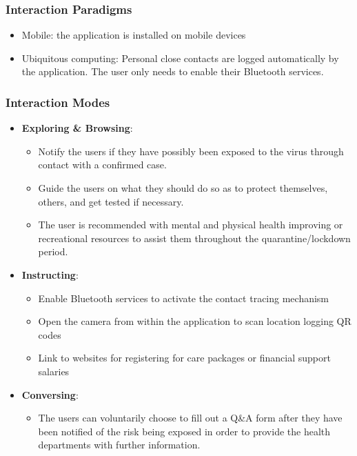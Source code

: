     \subsubsection{Interaction Paradigms}
      \begin{itemize}
        \item Mobile: the application is installed on mobile devices
        \item Ubiquitous computing: Personal close contacts are logged automatically by the application. The user only needs to enable their Bluetooth services.
      \end{itemize}

    \subsubsection{Interaction Modes}
      \begin{itemize}
        \item \textbf{Exploring \& Browsing}:
          \begin{itemize}
            \item Notify the users if they have possibly been exposed to the virus through contact with a confirmed case.
            \item Guide the users on what they should do so as to protect themselves, others, and get tested if necessary.
            \item The user is recommended with mental and physical health improving or recreational resources to assist them throughout the quarantine/lockdown period.
          \end{itemize}
        \item \textbf{Instructing}:
          \begin{itemize}
            \item Enable Bluetooth services to activate the contact tracing mechanism
            \item Open the camera from within the application to scan location logging QR codes
            \item Link to websites for registering for care packages or financial support salaries
          \end{itemize}
        \item \textbf{Conversing}:
          \begin{itemize}
            \item The users can voluntarily choose to fill out a Q\&A form after they have been notified of the risk being exposed in order to provide the health departments with further information.
          \end{itemize}
      \end{itemize}
    
